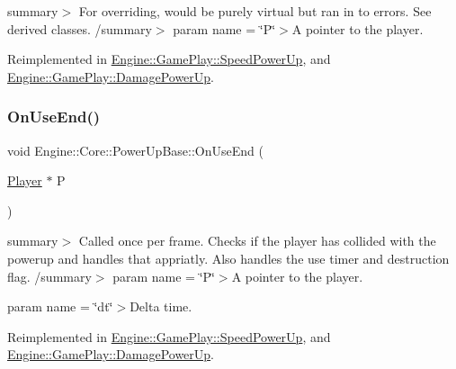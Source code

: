 summary$>$ For overriding, would be purely virtual but ran in to errors. See derived classes. /summary$>$ param name = \char`\"{}\+P\char`\"{}$>$A pointer to the player.

Reimplemented in \hyperlink{class_engine_1_1_game_play_1_1_speed_power_up_a0901961fb01656a2b81ccf846e370e31}{Engine\+::\+Game\+Play\+::\+Speed\+Power\+Up}, and \hyperlink{class_engine_1_1_game_play_1_1_damage_power_up_abadfb61b67dd580bc98d7e120c2809cd}{Engine\+::\+Game\+Play\+::\+Damage\+Power\+Up}.

\mbox{\label{class_engine_1_1_core_1_1_power_up_base_a195aecea60afdb99add60661a1c95697}} 
\subsubsection{\texorpdfstring{On\+Use\+End()}{OnUseEnd()}}
{\footnotesize\ttfamily void Engine\+::\+Core\+::\+Power\+Up\+Base\+::\+On\+Use\+End (\begin{DoxyParamCaption}\item[{\hyperlink{class_engine_1_1_game_play_1_1_player}{Player} $\ast$}]{P }\end{DoxyParamCaption})\hspace{0.3cm}{\ttfamily [virtual]}}

summary$>$ Called once per frame. Checks if the player has collided with the powerup and handles that appriatly. Also handles the use timer and destruction flag. /summary$>$ param name = \char`\"{}\+P\char`\"{}$>$A pointer to the player.

param name = \char`\"{}dt\char`\"{}$>$Delta time.

Reimplemented in \hyperlink{class_engine_1_1_game_play_1_1_speed_power_up_ad305e70493c2b51a87e58d58cea73521}{Engine\+::\+Game\+Play\+::\+Speed\+Power\+Up}, and \hyperlink{class_engine_1_1_game_play_1_1_damage_power_up_a97bdd448602470ff4305b39eee866fd2}{Engine\+::\+Game\+Play\+::\+Damage\+Power\+Up}.

\mbox{\label{class_engine_1_1_core_1_1_power_up_base_a8f6f5112493d25a67ec0c05e65691728}} 
